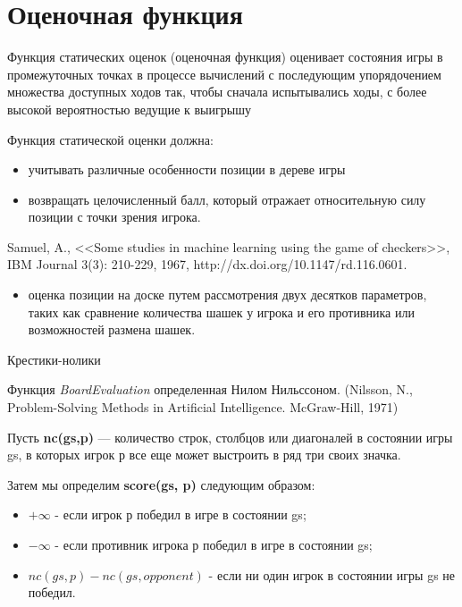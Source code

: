 \documentclass{beamer}
\begin{document}
\section{Оценочная функция}

\begin{frame}
\begin{block}{Функция статических оценок (оценочная функция)}
оценивает состояния игры в промежуточных точках в процессе вычислений с последующим упорядочением множества доступных ходов так, чтобы сначала испытывались ходы, с более высокой вероятностью ведущие к выигрышу
\end{block}
Функция статической оценки должна:
\begin{itemize}
\item учитывать различные особенности позиции в дереве игры 
\item возвращать целочисленный балл, который отражает относительную силу позиции с точки зрения игрока. 
\end{itemize} 
Samuel, A., <<Some studies in machine learning using the game of checkers>>, IBM Journal
3(3): 210-229, 1967, http://dx.doi.org/10.1147/rd.116.0601.
\begin{itemize}
\item оценка позиции на доске путем рассмотрения двух десятков параметров, таких как сравнение количества шашек у игрока и его противника или возможностей размена шашек.
\end{itemize}
\end{frame}

\begin{frame}{Крестики-нолики}
\begin{block}{Функция \textit{BoardEvaluation}}
определенная Нилом Нильссоном.  (Nilsson, N., Problem-Solving Methods in Artificial Intelligence. McGraw-Hill, 1971)
\end{block}
Пусть \textbf{nc(gs,p)} — количество строк, столбцов или диагоналей в состоянии игры gs, в которых игрок р все еще может выстроить в ряд три своих значка. 

Затем мы определим \textbf{score(gs, p)} следующим образом:
\begin{itemize}
\item $+\infty$ - если игрок р победил в игре в состоянии gs;
\item $-\infty$ - если противник игрока р победил в игре в состоянии gs;
\item $nc(gs,p)-nc(gs, opponent)$ - если ни один игрок в состоянии игры gs не победил.
\end{itemize}
\end{frame}
\end{document}
